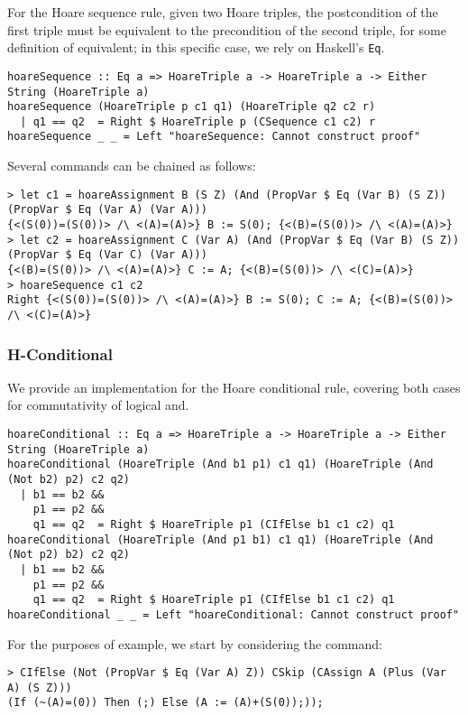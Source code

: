 \documentclass{article}
\begin{document}
For the Hoare sequence rule, given two Hoare triples, the postcondition of the first triple must be equivalent to the precondition of the second triple, for some definition of equivalent; in this specific case, we rely on Haskell's \texttt{Eq}.

\begin{lstlisting}
hoareSequence :: Eq a => HoareTriple a -> HoareTriple a -> Either String (HoareTriple a)
hoareSequence (HoareTriple p c1 q1) (HoareTriple q2 c2 r)
  | q1 == q2  = Right $ HoareTriple p (CSequence c1 c2) r
hoareSequence _ _ = Left "hoareSequence: Cannot construct proof"
\end{lstlisting}

Several commands can be chained as follows:

\begin{lstlisting}
> let c1 = hoareAssignment B (S Z) (And (PropVar $ Eq (Var B) (S Z)) (PropVar $ Eq (Var A) (Var A)))
{<(S(0))=(S(0))> /\ <(A)=(A)>} B := S(0); {<(B)=(S(0))> /\ <(A)=(A)>}
> let c2 = hoareAssignment C (Var A) (And (PropVar $ Eq (Var B) (S Z)) (PropVar $ Eq (Var C) (Var A)))
{<(B)=(S(0))> /\ <(A)=(A)>} C := A; {<(B)=(S(0))> /\ <(C)=(A)>}
> hoareSequence c1 c2
Right {<(S(0))=(S(0))> /\ <(A)=(A)>} B := S(0); C := A; {<(B)=(S(0))> /\ <(C)=(A)>}
\end{lstlisting}

\subsubsection{H-Conditional}

We provide an implementation for the Hoare conditional rule, covering both cases for commutativity of logical and.

\begin{lstlisting}
hoareConditional :: Eq a => HoareTriple a -> HoareTriple a -> Either String (HoareTriple a)
hoareConditional (HoareTriple (And b1 p1) c1 q1) (HoareTriple (And (Not b2) p2) c2 q2)
  | b1 == b2 &&
    p1 == p2 &&
    q1 == q2  = Right $ HoareTriple p1 (CIfElse b1 c1 c2) q1
hoareConditional (HoareTriple (And p1 b1) c1 q1) (HoareTriple (And (Not p2) b2) c2 q2)
  | b1 == b2 &&
    p1 == p2 &&
    q1 == q2  = Right $ HoareTriple p1 (CIfElse b1 c1 c2) q1
hoareConditional _ _ = Left "hoareConditional: Cannot construct proof"
\end{lstlisting}

For the purposes of example, we start by considering the command:

\begin{lstlisting}
> CIfElse (Not (PropVar $ Eq (Var A) Z)) CSkip (CAssign A (Plus (Var A) (S Z)))
(If (~(A)=(0)) Then (;) Else (A := (A)+(S(0));));
\end{lstlisting}
\end{document}
